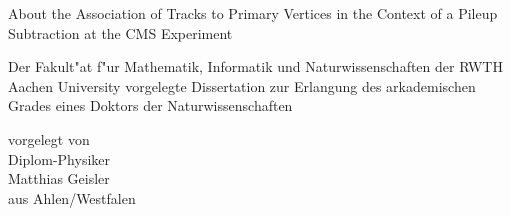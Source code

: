 \begin{titlepage}

\begin{center}
\vspace*{7.5cm}
\textrm{\LARGE About the Association of Tracks to Primary Vertices in the Context of a Pileup Subtraction at the CMS Experiment}
\\[1.5cm]
\end{center}

\textsf{\large Der Fakult"at f"ur Mathematik, Informatik und Naturwissenschaften der RWTH Aachen University vorgelegte Dissertation zur Erlangung des arkademischen Grades eines Doktors der Naturwissenschaften}\\[0.5cm]


\begin{center}
\textsf{\large vorgelegt von}\\[0.8cm]
\textsf{\large Diplom-Physiker}\\[0.8cm]
\textsf{\large Matthias Geisler}\\[0.8cm]
\textsf{\large aus Ahlen/Westfalen}\\[0.8cm]
\end{center}

\vfill

\end{titlepage}